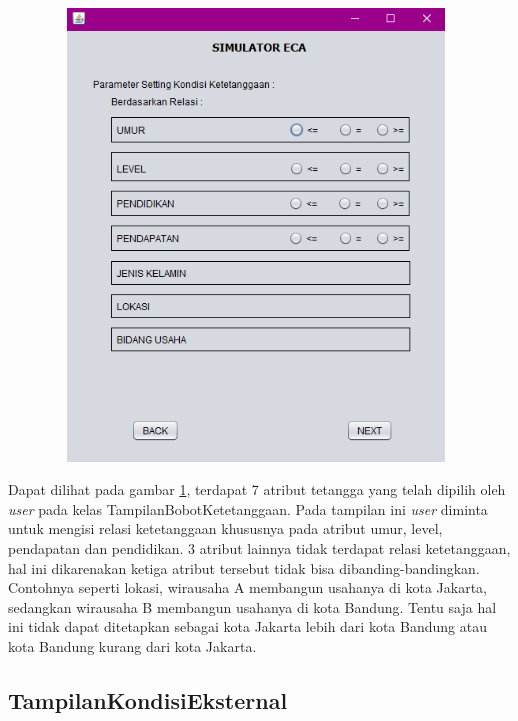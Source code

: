 \begin{figure} [H]
	\centering  
	\includegraphics[width=11cm, height=12cm]{tampilanKondisiKetetanggaan} 
	\label{fig:kondisiTetangga} 
\end{figure}

Dapat dilihat pada gambar \ref{fig:kondisiTetangga}, terdapat 7 atribut tetangga yang telah dipilih oleh \textit{user} pada kelas TampilanBobotKetetanggaan. Pada tampilan ini \textit{user} diminta untuk mengisi relasi ketetanggaan khususnya pada atribut umur, level, pendapatan dan pendidikan. 3 atribut lainnya tidak terdapat relasi ketetanggaan, hal ini dikarenakan ketiga atribut tersebut tidak bisa dibanding-bandingkan. Contohnya seperti lokasi, wirausaha A membangun usahanya di kota Jakarta, sedangkan wirausaha B membangun usahanya di kota Bandung. Tentu saja hal ini tidak dapat ditetapkan sebagai kota Jakarta lebih dari kota Bandung atau kota Bandung kurang dari kota Jakarta.

\subsection{TampilanKondisiEksternal}

